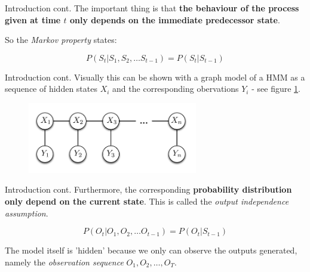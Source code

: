 \documentclass[11pt]{beamer}
\begin{document}
\begin{frame}{Introduction cont.}
The important thing is that \textbf{the behaviour of the process given at time $t$ only depends on the immediate predecessor state}.

So the \emph{Markov property} states:

\begin{equation}
	P(S_t | S_1,S_2, \ldots S_{t-1}) = P(S_t | S_{t-1})
\end{equation}
\end{frame}

\begin{frame}{Introduction cont.}
Visually this can be shown with a graph model of a HMM as a sequence of hidden states $X_i$ and the corresponding obervations $Y_i$ - see figure \ref{fig:GraphModel}.

\begin{figure}[H]
	\centering
	
	\includegraphics[width=0.66\textwidth]{./Images/GraphModelHMM_1.png}
	\caption{ \cite{hmm_II}}
	\label{fig:GraphModel}
\end{figure}

\end{frame}

\begin{frame}{Introduction cont.}
Furthermore, the corresponding \textbf{probability distribution only depend on the current state}. This is called the \emph{output independence assumption}.

\begin{equation}
P(O_t | O_1,O_2, \ldots O_{t-1}) = P(O_t | S_{t-1})
\end{equation}

The model itself is 'hidden' because we only can observe the outputs generated, namely the \emph{observation sequence} $O_1, O_2, \ldots,  O_T$.
\end{frame}
\end{document}
